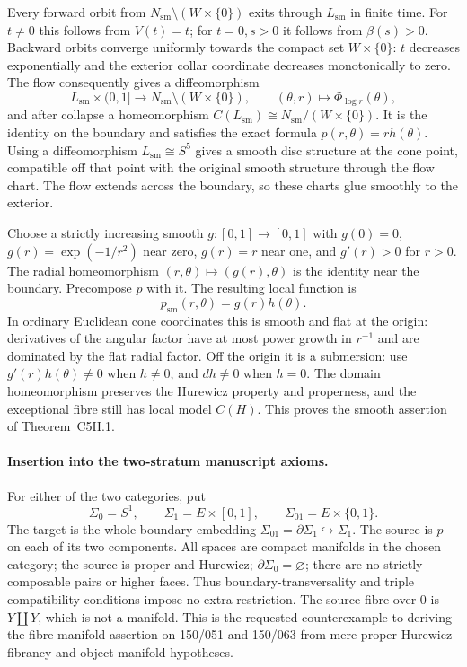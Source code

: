 Every forward orbit from $N_{\mathrm{sm}}\setminus(W\times\{0\})$ exits
through $L_{\mathrm{sm}}$ in finite time.  For $t\ne0$ this follows from
$V(t)=t$; for $t=0,s>0$ it follows from $\beta(s)>0$.
Backward orbits converge uniformly towards the compact set
$W\times\{0\}$: $t$ decreases exponentially and the exterior collar
coordinate decreases monotonically to zero.  The flow consequently gives
a diffeomorphism
\[
 L_{\mathrm{sm}}\times(0,1]\longrightarrow
 N_{\mathrm{sm}}\setminus(W\times\{0\}),\qquad
 (\theta,r)\longmapsto\Phi_{\log r}(\theta),
\]
and after collapse a homeomorphism $C(L_{\mathrm{sm}})\cong
N_{\mathrm{sm}}/(W\times\{0\})$.  It is the identity on the boundary and
satisfies the exact formula $p(r,\theta)=rh(\theta)$.
Using a diffeomorphism $L_{\mathrm{sm}}\cong S^5$ gives a smooth disc
structure at the cone point, compatible off that point with the original
smooth structure through the flow chart.  The flow extends across the
boundary, so these charts glue smoothly to the exterior.

Choose a strictly increasing smooth $g:[0,1]\to[0,1]$ with $g(0)=0$,
$g(r)=\exp(-1/r^2)$ near zero, $g(r)=r$ near one, and $g'(r)>0$ for $r>0$.
The radial homeomorphism $(r,\theta)\mapsto(g(r),\theta)$ is the identity
near the boundary.  Precompose $p$ with it.  The resulting local function
is
\[
 p_{\mathrm{sm}}(r,\theta)=g(r)h(\theta).
 \tag{C5H.9}
\]
In ordinary Euclidean cone coordinates this is smooth and flat at the
origin: derivatives of the angular factor have at most power growth in
$r^{-1}$ and are dominated by the flat radial factor.  Off the origin it
is a submersion: use $g'(r)h(\theta)\ne0$ when $h\ne0$, and $dh\ne0$ when
$h=0$.  The domain homeomorphism preserves the Hurewicz property and
properness, and the exceptional fibre still has local model $C(H)$.
This proves the smooth assertion of Theorem~C5H.1.

\paragraph{Insertion into the two-stratum manuscript axioms.}
For either of the two categories, put
\[
 \Sigma_0=S^1,\qquad \Sigma_1=E\times[0,1],\qquad
 \Sigma_{01}=E\times\{0,1\}.
\]
The target is the whole-boundary embedding
$\Sigma_{01}=\partial\Sigma_1\hookrightarrow\Sigma_1$.
The source is $p$ on each of its two components.  All spaces are compact
manifolds in the chosen category; the source is proper and Hurewicz;
$\partial\Sigma_0=\varnothing$; there are no strictly composable pairs or
higher faces.  Thus boundary-transversality and triple compatibility
conditions impose no extra restriction.  The source fibre over $0$ is
$Y\amalg Y$, which is not a manifold.  This is the requested counterexample
to deriving the fibre-manifold assertion on 150/051 and 150/063 from mere
proper Hurewicz fibrancy and object-manifold hypotheses.

